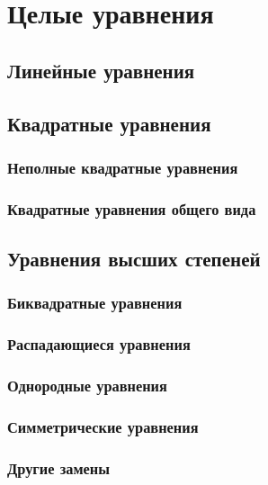 \documentclass[10pt, a4paper]{article}
\begin{document}
\section{Целые уравнения}
	\subsection{Линейные уравнения}
	\subsection{Квадратные уравнения}
		\subsubsection{Неполные квадратные уравнения}
		\subsubsection{Квадратные уравнения общего вида}
	\subsection{Уравнения высших степеней}
		\subsubsection{Биквадратные уравнения}
		\subsubsection{Распадающиеся уравнения}
		\subsubsection{Однородные уравнения}
		\subsubsection{Симметрические уравнения}
		\subsubsection{Другие замены}
\end{document}
